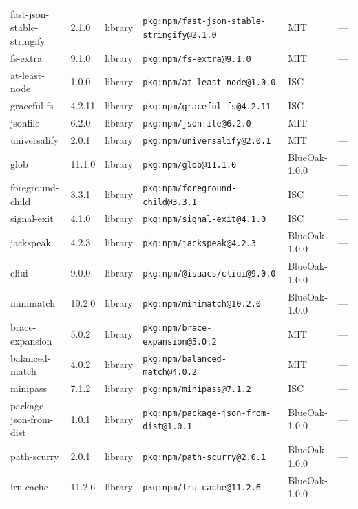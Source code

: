 \documentclass[11pt,a4paper]{article}
\begin{document}
\begin{longtable}{|p{4cm}|p{2cm}|p{1.6cm}|p{5cm}|p{1.5cm}|p{3.5cm}|}
\raggedright fast-json-stable-stringify & 2.1.0 & library & \small\texttt{pkg:npm/fast-json-stable-stringify@2.1.0} & MIT & \small — \\
\raggedright fs-extra & 9.1.0 & library & \small\texttt{pkg:npm/fs-extra@9.1.0} & MIT & \small — \\
\raggedright at-least-node & 1.0.0 & library & \small\texttt{pkg:npm/at-least-node@1.0.0} & ISC & \small — \\
\raggedright graceful-fs & 4.2.11 & library & \small\texttt{pkg:npm/graceful-fs@4.2.11} & ISC & \small — \\
\raggedright jsonfile & 6.2.0 & library & \small\texttt{pkg:npm/jsonfile@6.2.0} & MIT & \small — \\
\raggedright universalify & 2.0.1 & library & \small\texttt{pkg:npm/universalify@2.0.1} & MIT & \small — \\
\raggedright glob & 11.1.0 & library & \small\texttt{pkg:npm/glob@11.1.0} & BlueOak-1.0.0 & \small — \\
\raggedright foreground-child & 3.3.1 & library & \small\texttt{pkg:npm/foreground-child@3.3.1} & ISC & \small — \\
\raggedright signal-exit & 4.1.0 & library & \small\texttt{pkg:npm/signal-exit@4.1.0} & ISC & \small — \\
\raggedright jackspeak & 4.2.3 & library & \small\texttt{pkg:npm/jackspeak@4.2.3} & BlueOak-1.0.0 & \small — \\
\raggedright cliui & 9.0.0 & library & \small\texttt{pkg:npm/@isaacs/cliui@9.0.0} & BlueOak-1.0.0 & \small — \\
\raggedright minimatch & 10.2.0 & library & \small\texttt{pkg:npm/minimatch@10.2.0} & BlueOak-1.0.0 & \small — \\
\raggedright brace-expansion & 5.0.2 & library & \small\texttt{pkg:npm/brace-expansion@5.0.2} & MIT & \small — \\
\raggedright balanced-match & 4.0.2 & library & \small\texttt{pkg:npm/balanced-match@4.0.2} & MIT & \small — \\
\raggedright minipass & 7.1.2 & library & \small\texttt{pkg:npm/minipass@7.1.2} & ISC & \small — \\
\raggedright package-json-from-dist & 1.0.1 & library & \small\texttt{pkg:npm/package-json-from-dist@1.0.1} & BlueOak-1.0.0 & \small — \\
\raggedright path-scurry & 2.0.1 & library & \small\texttt{pkg:npm/path-scurry@2.0.1} & BlueOak-1.0.0 & \small — \\
\raggedright lru-cache & 11.2.6 & library & \small\texttt{pkg:npm/lru-cache@11.2.6} & BlueOak-1.0.0 & \small — \\

\end{longtable}
\end{document}
